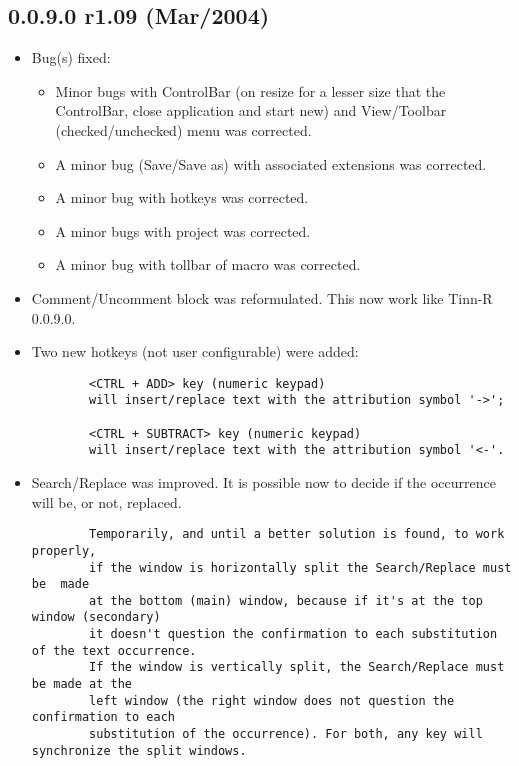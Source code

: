 \subsection*{0.0.9.0 r1.09 (Mar/2004)}
\begin{itemize}
  \item Bug(s) fixed:
    \begin{itemize}
      \item Minor bugs with ControlBar (on resize for a lesser size that the
        ControlBar, close application and start new) and View/Toolbar
        (checked/unchecked) menu was corrected.
      \item A minor bug (Save/Save as) with associated extensions was corrected.
      \item A minor bug with hotkeys was corrected.
      \item A minor bugs with project was corrected.
      \item A minor bug with tollbar of macro was corrected.
    \end{itemize}
  \item Comment/Uncomment block was reformulated. This now work like
    Tinn-R 0.0.9.0.
  \item Two new hotkeys (not user configurable) were added:

    \begin{footnotesize}
      \begin{verbatim}
        <CTRL + ADD> key (numeric keypad)
        will insert/replace text with the attribution symbol '->';

        <CTRL + SUBTRACT> key (numeric keypad)
        will insert/replace text with the attribution symbol '<-'.
      \end{verbatim}
    \end{footnotesize}

  \item Search/Replace was improved. It is possible now to decide if the
    occurrence will be, or not, replaced.

    \begin{footnotesize}
      \begin{verbatim}
        Temporarily, and until a better solution is found, to work properly,
        if the window is horizontally split the Search/Replace must be  made
        at the bottom (main) window, because if it's at the top window (secondary)
        it doesn't question the confirmation to each substitution of the text occurrence.
        If the window is vertically split, the Search/Replace must be made at the
        left window (the right window does not question the confirmation to each
        substitution of the occurrence). For both, any key will synchronize the split windows.
      \end{verbatim}
    \end{footnotesize}


\end{itemize}
